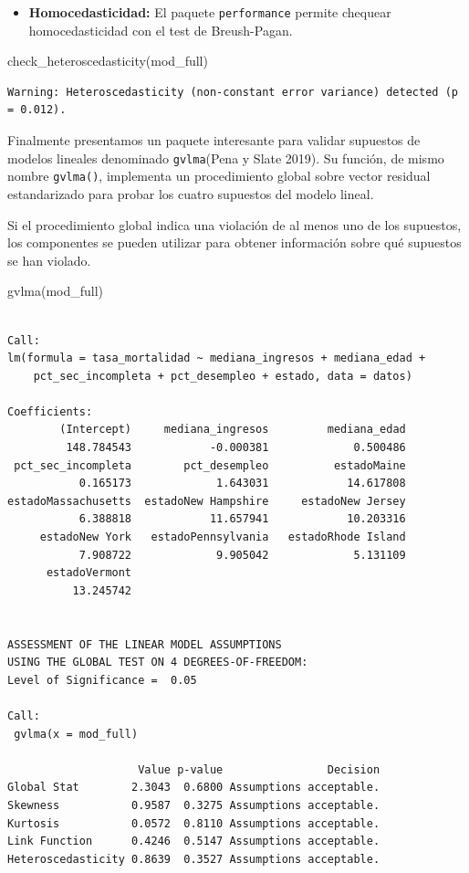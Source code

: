 \documentclass[
  spanish,
  a4paper,
]{scrbook}
\newenvironment{Shaded}{\begin{snugshade}}{\end{snugshade}}
\newcommand{\FunctionTok}[1]{\textcolor[rgb]{0.28,0.35,0.67}{#1}}
\newcommand{\NormalTok}[1]{\textcolor[rgb]{0.00,0.23,0.31}{#1}}
\providecommand{\tightlist}{%
  \setlength{\itemsep}{0pt}\setlength{\parskip}{0pt}}
\begin{document}
\begin{itemize}
\tightlist
\item
  \textbf{Homocedasticidad:} El paquete \texttt{performance} permite
  chequear homocedasticidad con el test de Breush-Pagan.
\end{itemize}

\begin{Shaded}
\begin{Highlighting}[]
\FunctionTok{check\_heteroscedasticity}\NormalTok{(mod\_full)}
\end{Highlighting}
\end{Shaded}

\begin{verbatim}
Warning: Heteroscedasticity (non-constant error variance) detected (p = 0.012).
\end{verbatim}

Finalmente presentamos un paquete interesante para validar supuestos de
modelos lineales denominado \texttt{gvlma}(Pena y Slate 2019). Su
función, de mismo nombre \texttt{gvlma()}, implementa un procedimiento
global sobre vector residual estandarizado para probar los cuatro
supuestos del modelo lineal.

Si el procedimiento global indica una violación de al menos uno de los
supuestos, los componentes se pueden utilizar para obtener información
sobre qué supuestos se han violado.

\begin{Shaded}
\begin{Highlighting}[]
\FunctionTok{gvlma}\NormalTok{(mod\_full)}
\end{Highlighting}
\end{Shaded}

\begin{verbatim}

Call:
lm(formula = tasa_mortalidad ~ mediana_ingresos + mediana_edad + 
    pct_sec_incompleta + pct_desempleo + estado, data = datos)

Coefficients:
        (Intercept)     mediana_ingresos         mediana_edad  
         148.784543            -0.000381             0.500486  
 pct_sec_incompleta        pct_desempleo          estadoMaine  
           0.165173             1.643031            14.617808  
estadoMassachusetts  estadoNew Hampshire     estadoNew Jersey  
           6.388818            11.657941            10.203316  
     estadoNew York   estadoPennsylvania   estadoRhode Island  
           7.908722             9.905042             5.131109  
      estadoVermont  
          13.245742  


ASSESSMENT OF THE LINEAR MODEL ASSUMPTIONS
USING THE GLOBAL TEST ON 4 DEGREES-OF-FREEDOM:
Level of Significance =  0.05 

Call:
 gvlma(x = mod_full) 

                    Value p-value                Decision
Global Stat        2.3043  0.6800 Assumptions acceptable.
Skewness           0.9587  0.3275 Assumptions acceptable.
Kurtosis           0.0572  0.8110 Assumptions acceptable.
Link Function      0.4246  0.5147 Assumptions acceptable.
Heteroscedasticity 0.8639  0.3527 Assumptions acceptable.
\end{verbatim}
\end{document}

